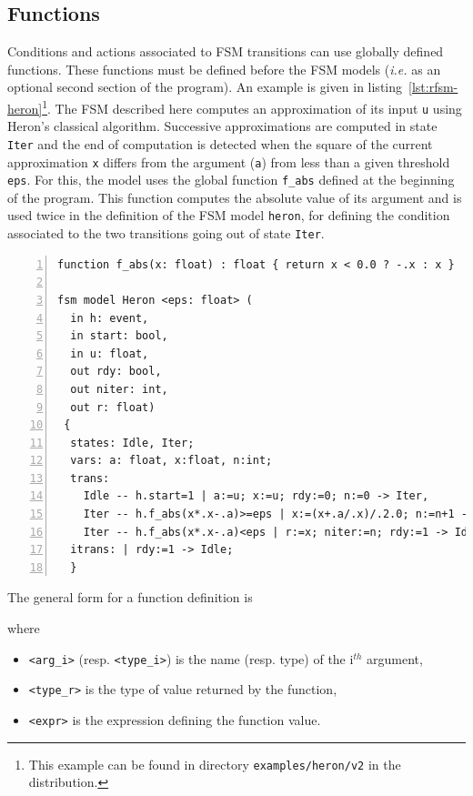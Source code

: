 \subsection{Functions}
\label{sec:functions}

Conditions and actions associated to FSM transitions can use globally defined functions. These
functions must be defined before the FSM models (\emph{i.e.} as an optional second section of the
program). An example is given in listing~\ref{lst:rfsm-heron}\footnote{This example can be found in
  directory \texttt{examples/heron/v2} in the distribution.}. The FSM described here computes an
approximation of its input \verb|u| using Heron's classical algorithm. Successive approximations are
computed in state \verb|Iter| and the end of computation is detected when the square of the current
approximation \verb|x| differs from the argument (\verb|a|) from less than a given threshold
\verb|eps|. For this, the model uses the global function \verb|f_abs| defined at the beginning of
the program. This function computes the absolute value of its argument and is used twice in the
definition of the FSM model \verb|heron|, for defining the condition associated to the two
transitions going out of state \verb|Iter|.

\begin{lstlisting}[language=Rfsm,frame=single,numbers=left,caption=An RFSM program using a global
  function definition,label={lst:rfsm-heron},float]
function f_abs(x: float) : float { return x < 0.0 ? -.x : x }

fsm model Heron <eps: float> (
  in h: event, 
  in start: bool,
  in u: float,
  out rdy: bool,
  out niter: int,
  out r: float)
 {
  states: Idle, Iter;
  vars: a: float, x:float, n:int;
  trans:
    Idle -- h.start=1 | a:=u; x:=u; rdy:=0; n:=0 -> Iter,
    Iter -- h.f_abs(x*.x-.a)>=eps | x:=(x+.a/.x)/.2.0; n:=n+1 -> Iter,
    Iter -- h.f_abs(x*.x-.a)<eps | r:=x; niter:=n; rdy:=1 -> Idle;
  itrans: | rdy:=1 -> Idle;
  }
\end{lstlisting}

\medskip
\step The general form for a function definition is 

\begin{center}
\end{center}

\noindent
where
\begin{itemize}
\item \lstinline[language=Rfsm]|<arg_i>| (resp. \lstinline[language=Rfsm]|<type_i>|) is the name
  (resp. type) of the i$^{th}$ argument,
\item \lstinline[language=Rfsm]|<type_r>| is the type of value returned by the function,
\item \lstinline[language=Rfsm]|<expr>| is the expression defining the function value.
\end{itemize}

